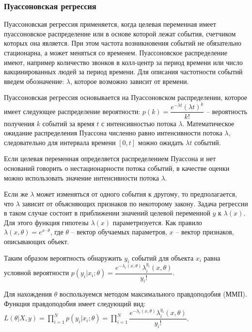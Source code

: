 \subsubsection{Пуассоновская регрессия}

Пуассоновская регрессия применяется, когда целевая переменная имеет пуассоновское распределение или в основе которой лежат события, счетчиком которых она является. При этом частота возникновения событий не обязательно стационарна, а может меняться со временем. Пуассоновское распределение имеют, например количество звонков в колл-центр за период времени или число вакцинированных людей за период времени. Для описания частотности событий введем обозначение: $\lambda$, которое возможно зависит от времени.

Пуассоновская регрессия основывается на Пуассоновском распределении, которое имеет следующее распределение вероятности: $p(k) = \dfrac{e^{-\lambda t} (\lambda t)^k}{k!}$ -- вероятность получения $k$ событий за время $t$ с интенсивностью потока $\lambda$. Математическое ожидание распределения Пуассона численно равно интенсивности потока $\lambda$, следовательно для интервала времени $[0, t]$ можно ожидать $\lambda t$ событий.

Если целевая переменная определяется распределением Пуассона и нет оснований говорить о нестационарности потока событий, в качестве оценки можно использовать значение интенсивности потока $\lambda$.

Если же $\lambda$ может изменяться от одного события к другому, то предполагается, что $\lambda$ зависит от объясняющих признаков по некоторому закону. Задача регрессии в таком случае состоит в приближении значений целевой переменной $y$ к $\lambda(x)$. Для этого функция гипотезы $\lambda(x)$ параметризуется. Как правило \cite{Ignatov:functional_dependence} $\lambda(x, \theta) = e^{x \cdot \theta}$, где $\theta$ -- вектор обучаемых параметров, $x$ -- вектор признаков, описывающих объект.

Таким образом вероятность обнаружить $y_i$ событий для объекта $x_i$ равна условной вероятности $p(y_i | x_i ; \theta) = \dfrac{e^{-\lambda_i(x, \theta)} \lambda_i^{y_i}(x, \theta)}{y_i!}$.

Для нахождения $\theta$ воспользуемся методом максимального правдоподобия (ММП). Функция правдоподобия имеет следующий вид: $L(\theta | X, y) = \prod\limits_{i=1}^{N} p(y_i | x_i; \theta) = \prod\limits_{i=1}^{N} \dfrac{e^{-\lambda_i(x, \theta)} \lambda_i^{y_i}(x, \theta)}{y_i!}$.


